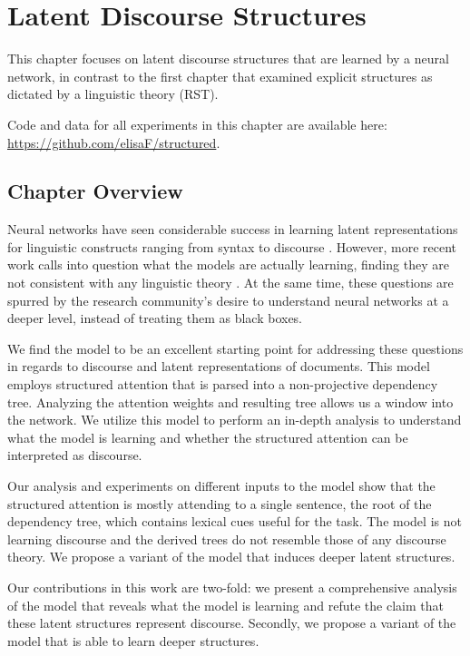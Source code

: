 \chapter{Latent Discourse Structures}
\label{ch:latent}

This chapter focuses on latent discourse structures that are learned by a neural network, in contrast to the first chapter that examined explicit structures as dictated by a linguistic theory (RST). 

Code and data for all experiments in this chapter are available here: \url{https://github.com/elisaF/structured}.

\section{Chapter Overview}
Neural networks have seen considerable success in learning latent representations for linguistic constructs ranging from syntax to discourse \cite{Choi:2017,Yogatama:2017,Liu:2018}. However, more recent work calls into question what the models are actually learning, finding they are not consistent with any linguistic theory \cite{Williams:2017}. At the same time, these questions are spurred by the research community's desire to understand neural networks at a deeper level, instead of treating them as black boxes.

We find the  model to be an excellent starting point for addressing these questions in regards to discourse and latent representations of documents. This model employs structured attention that is parsed into a non-projective dependency tree. Analyzing the attention weights and resulting tree allows us a window into the network. We utilize this model to perform an in-depth analysis to understand what the model is learning and whether the structured attention can be interpreted as discourse. 

Our analysis and experiments on different inputs to the model show that the structured attention is mostly attending to a single sentence, the root of the dependency tree, which contains lexical cues useful for the task. The model is not learning discourse and the derived trees do not resemble those of any discourse theory. We propose a variant of the model that induces deeper latent structures.

Our contributions in this work are two-fold: we present a comprehensive analysis of the  model that reveals what the model is learning and refute the claim that these latent structures represent discourse. Secondly, we propose a variant of the model that is able to learn deeper structures.

